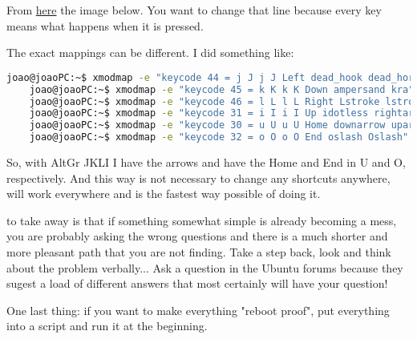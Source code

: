 \vspace{.5cm}
From \href{https://askubuntu.com/questions/1025765/how-to-map-alt-hjkl-keys-to-arrow-keys}{here} the image below. You want to change that line because every key means what happens when it is pressed.


\par The exact mappings can be different. I did something like:

\begin{lstlisting}[language=bash, numbers=none]
    joao@joaoPC:~$ xmodmap -e "keycode 44 = j J j J Left dead_hook dead_horn"
    joao@joaoPC:~$ xmodmap -e "keycode 45 = k K k K Down ampersand kra"
    joao@joaoPC:~$ xmodmap -e "keycode 46 = l L l L Right Lstroke lstroke"
    joao@joaoPC:~$ xmodmap -e "keycode 31 = i I i I Up idotless rightarrow"
    joao@joaoPC:~$ xmodmap -e "keycode 30 = u U u U Home downarrow uparrow"
    joao@joaoPC:~$ xmodmap -e "keycode 32 = o O o O End oslash Oslash"
\end{lstlisting}

\par So, with AltGr JKLI I have the arrows and have the Home and End in U and O, respectively. And this way is not necessary to change any shortcuts anywhere, will work everywhere and is the fastest way possible of doing it.

\par {} to take away is that if something somewhat simple is already becoming a mess, you are probably asking the wrong questions and there is a much shorter and more pleasant path that you are not finding. Take a step back, look and think about the problem verbally... Ask a question in the Ubuntu forums because they sugest a load of different answers that most certainly will have your question!



\vspace{1cm}

One last thing: if you want to make everything "reboot proof", put everything into a script and run it at the beginning.



